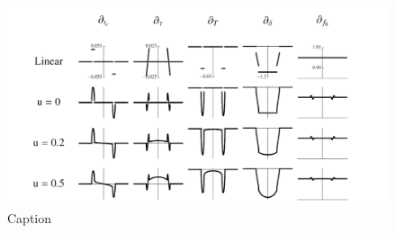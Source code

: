 \documentclass[oneside,12pt]{amsart}
\numberwithin{page}{section}
\begin{document}

\begin{figure}[htbp]
    \centering
    \includegraphics[width=0.5\linewidth]{figs/carter_fig2.png}
    \caption{Caption}
    \label{fig:carter-fig2}
\end{figure}
\end{document}
